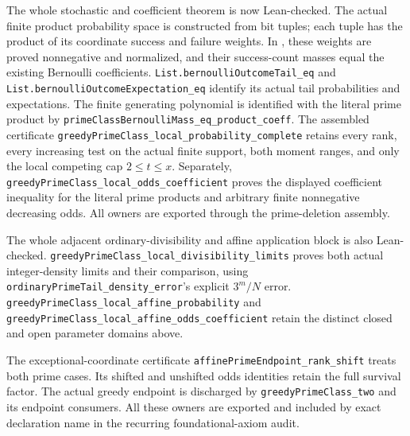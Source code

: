 \documentclass[11pt]{article}
\theoremstyle{definition}
\begin{document}
The whole stochastic and coefficient theorem is now Lean-checked.
The actual finite product probability space is constructed from bit
tuples; each tuple has the product of its coordinate success and
failure weights. In
,
these weights are proved nonnegative and normalized, and their
success-count masses equal the existing Bernoulli coefficients.
\texttt{List.bernoulliOutcomeTail\_eq} and
\texttt{List.bernoulliOutcomeExpectation\_eq}
identify its actual tail probabilities and expectations.
The finite generating polynomial is identified with the literal
prime product by
\texttt{primeClassBernoulliMass\_\allowbreak eq\_\allowbreak product\_\allowbreak coeff}.
The assembled certificate
\texttt{greedyPrimeClass\_\allowbreak local\_\allowbreak probability\_\allowbreak complete}
retains every rank, every increasing test on the actual finite
support, both moment ranges, and only the local competing cap
$2\le t\le x$.
Separately,
\texttt{greedyPrimeClass\_\allowbreak local\_\allowbreak odds\_\allowbreak coefficient}
proves the displayed coefficient inequality for the literal
prime products and arbitrary finite nonnegative decreasing odds.
All owners are exported through the prime-deletion assembly.

The whole adjacent ordinary-divisibility and affine application block
is also Lean-checked.
\texttt{greedyPrimeClass\_\allowbreak local\_\allowbreak divisibility\_\allowbreak limits}
proves both actual integer-density limits and their comparison, using
\texttt{ordinaryPrimeTail\_\allowbreak density\_\allowbreak error}'s
explicit \(3^m/N\) error.
\texttt{greedyPrimeClass\_\allowbreak local\_\allowbreak affine\_\allowbreak probability}
and
\texttt{greedyPrimeClass\_\allowbreak local\_\allowbreak affine\_\allowbreak odds\_\allowbreak coefficient}
retain the distinct closed and open parameter domains above.

The exceptional-coordinate certificate
\texttt{affinePrime\allowbreak Endpoint\_\allowbreak rank\_\allowbreak shift}
treats both prime cases. Its shifted and unshifted odds identities retain
the full survival factor.
The actual greedy endpoint is discharged by
\texttt{greedyPrimeClass\_\allowbreak two}
and its endpoint consumers.
All these owners are exported and included by exact declaration name
in the recurring foundational-axiom audit.
\end{document}
